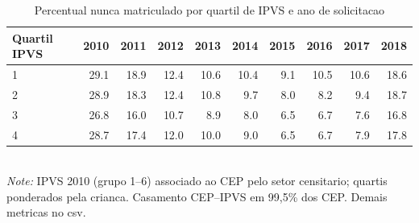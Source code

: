 \begin{table}[htbp]\centering
\caption{Percentual nunca matriculado por quartil de IPVS e ano de solicitacao}
\label{tab:T4b_ipvs}
\small
\setlength{\tabcolsep}{4pt}
\begin{tabular}{lrrrrrrrrr}
\toprule
Quartil IPVS & 2010 & 2011 & 2012 & 2013 & 2014 & 2015 & 2016 & 2017 & 2018 \\
\midrule
1 & 29.1 & 18.9 & 12.4 & 10.6 & 10.4 & 9.1 & 10.5 & 10.6 & 18.6 \\
2 & 28.9 & 18.3 & 12.4 & 10.8 & 9.7 & 8.0 & 8.2 & 9.4 & 18.7 \\
3 & 26.8 & 16.0 & 10.7 & 8.9 & 8.0 & 6.5 & 6.7 & 7.6 & 16.8 \\
4 & 28.7 & 17.4 & 12.0 & 10.0 & 9.0 & 6.5 & 6.7 & 7.9 & 17.8 \\
\bottomrule
\end{tabular}
\\[3pt]{\footnotesize \textit{Note:} IPVS 2010 (grupo 1--6) associado ao CEP pelo setor censitario; quartis ponderados pela crianca. Casamento CEP--IPVS em 99,5\% dos CEP. Demais metricas no csv.}
\end{table}
